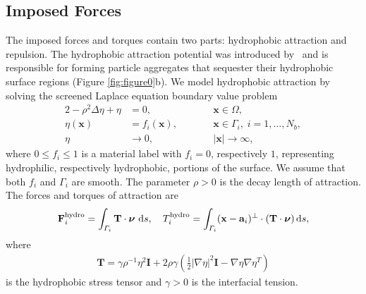 \documentclass[lineno]{jfm}
\renewcommand{\aa}{\mathbf{a}}
\newcommand{\FF}{\mathbf{F}}
\newcommand{\nnu}{\boldsymbol{\nu}}
\newcommand{\xx}{\mathbf{x}}
\begin{document}
\subsection{Imposed Forces}
The imposed forces and torques contain two parts: hydrophobic attraction
and repulsion. The hydrophobic attraction potential was introduced
by~\cite{Fu20} and is responsible for forming particle aggregates that
sequester their hydrophobic surface regions (Figure \ref{fig:figure0}b).
We model hydrophobic attraction by solving the screened Laplace equation
boundary value problem
\begin{alignat}{2}
  \label{eq:SL}
-\rho^2 \Delta \eta  + \eta  &=0,            && \xx \in \Omega,\\
\label{eq:SLbc}
\eta (\xx) &= f_i(\xx),\qquad  && \xx \in \Gamma_i,\; i=1,\ldots,N_b, \\
\label{eq:SLff}
\eta  &\to 0,                          &&|\xx| \to \infty,
\end{alignat}
where $0 \leq f_i \leq 1$ is a material label with $f_i = 0$,
respectively $1$, representing hydrophilic, respectively hydrophobic,
portions of the surface. We assume that both $f_i$ and $\Gamma_i$ are
smooth. The parameter $\rho > 0$ is the decay length of attraction. The
forces and torques of attraction are 
\begin{align}
  \label{eq:hydrophobicAttraction}
  \FF_i^{\text{hydro}} = \int_{\Gamma_i} {\bf T}\cdot \nnu \, \dif s, 
    \quad 
  T_i^{\text{hydro}} = \int_{\Gamma_i} (\xx - \aa_i)^{\perp} \cdot ({\bf T} \cdot \nnu) \dif s,
\end{align}
where
\begin{align}
  \label{eq:stress}
\mathbf{T}
= \gamma\rho^{-1}\eta ^2 \mathbf{I} + 2\rho\gamma \left(\tfrac{1}{2}|\nabla
  \eta |^2 \mathbf{I} - \nabla \eta   \nabla \eta ^T\right)
\end{align}
is the hydrophobic stress tensor and $\gamma > 0$ is
the interfacial
tension. 
\end{document}
